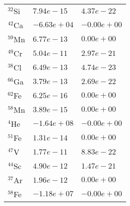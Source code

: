 \begin{tabular}{lll}
 $^{32}$Si & $7.94e-15 $                                                        & $4.37e-22 $                                                                     \\
 $^{42}$Ca & $-6.63e+04 $                                                       & $-0.00e+00 $                                                                    \\
 $^{59}$Mn & $6.77e-13 $                                                        & $0.00e+00 $                                                                     \\
 $^{49}$Cr & $5.04e-11 $                                                        & $2.97e-21 $                                                                     \\
 $^{38}$Cl & $6.49e-13 $                                                        & $4.74e-23 $                                                                     \\
 $^{66}$Ga & $3.79e-13 $                                                        & $2.69e-22 $                                                                     \\
 $^{62}$Fe & $6.25e-16 $                                                        & $0.00e+00 $                                                                     \\
 $^{58}$Mn & $3.89e-15 $                                                        & $0.00e+00 $                                                                     \\
 $^{4}$He  & $-1.64e+08 $                                                       & $-0.00e+00 $                                                                    \\
 $^{51}$Fe & $1.31e-14 $                                                        & $0.00e+00 $                                                                     \\
 $^{47}$V  & $1.77e-11 $                                                        & $8.83e-22 $                                                                     \\
 $^{44}$Sc & $4.90e-12 $                                                        & $1.47e-21 $                                                                     \\
 $^{37}$Ar & $1.96e-12 $                                                        & $0.00e+00 $                                                                     \\
 $^{58}$Fe & $-1.18e+07 $                                                       & $-0.00e+00 $                                                                    \\
\hline
\end{tabular}
